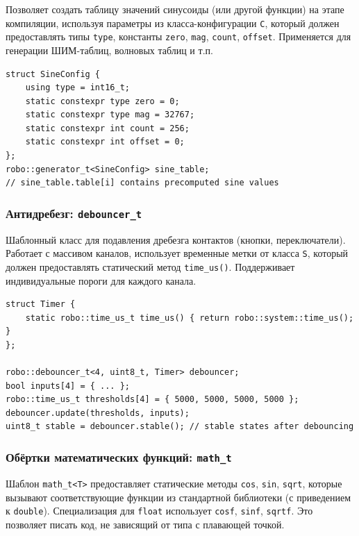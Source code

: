 \documentclass[a4paper,12pt]{article}
\begin{document}
Позволяет создать таблицу значений синусоиды (или другой функции) на этапе компиляции, используя параметры из класса-конфигурации \texttt{C}, который должен предоставлять типы \texttt{type}, константы \texttt{zero}, \texttt{mag}, \texttt{count}, \texttt{offset}. Применяется для генерации ШИМ-таблиц, волновых таблиц и т.п.

\begin{lstlisting}[caption={Generator usage example}]
struct SineConfig {
    using type = int16_t;
    static constexpr type zero = 0;
    static constexpr type mag = 32767;
    static constexpr int count = 256;
    static constexpr int offset = 0;
};
robo::generator_t<SineConfig> sine_table;
// sine_table.table[i] contains precomputed sine values
\end{lstlisting}

\subsubsection{Антидребезг: \texttt{debouncer\_t}}

Шаблонный класс для подавления дребезга контактов (кнопки, переключатели). Работает с массивом каналов, использует временные метки от класса \texttt{S}, который должен предоставлять статический метод \texttt{time\_us()}. Поддерживает индивидуальные пороги для каждого канала.

\begin{lstlisting}[caption={Debouncer usage example}]
struct Timer {
    static robo::time_us_t time_us() { return robo::system::time_us(); }
};

robo::debouncer_t<4, uint8_t, Timer> debouncer;
bool inputs[4] = { ... };
robo::time_us_t thresholds[4] = { 5000, 5000, 5000, 5000 };
debouncer.update(thresholds, inputs);
uint8_t stable = debouncer.stable(); // stable states after debouncing
\end{lstlisting}

\subsubsection{Обёртки математических функций: \texttt{math\_t}}

Шаблон \texttt{math\_t<T>} предоставляет статические методы \texttt{cos}, \texttt{sin}, \texttt{sqrt}, которые вызывают соответствующие функции из стандартной библиотеки (с приведением к \texttt{double}). Специализация для \texttt{float} использует \texttt{cosf}, \texttt{sinf}, \texttt{sqrtf}. Это позволяет писать код, не зависящий от типа с плавающей точкой.
\end{document}
